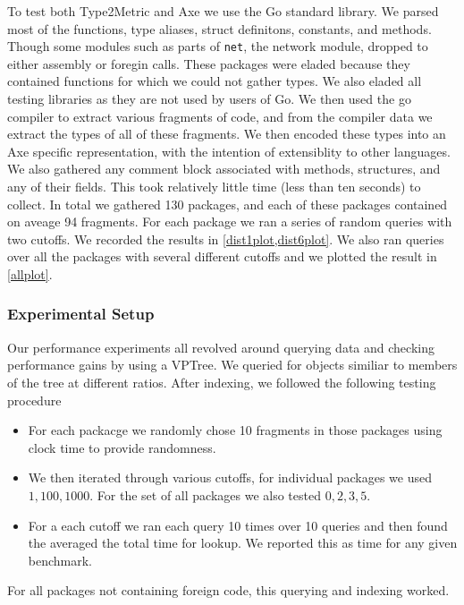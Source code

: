 To test both Type2Metric and Axe we use the Go standard library.
We parsed most of the functions, type aliases, struct definitons, constants, and methods.
Though some modules such as parts of \texttt{net}, the network module,
dropped to either assembly or foregin calls.
These packages were eladed because they contained functions for which we could not gather types.
We also eladed all testing libraries as they are not used by users of Go.
We then used the go compiler to extract various fragments of code,
and from the compiler data we extract the types of all of these fragments.
We then encoded these types into an Axe specific representation,
with the intention of extensiblity to other languages.
We also gathered any comment block associated with methods, structures, and any of their fields.
This took relatively little time (less than ten seconds) to collect.
In total we gathered 130 packages, 
and each of these packages contained on aveage 94 fragments.
For each package we ran a series of random queries with two cutoffs.
We recorded the results in \ref{dist1plot,dist6plot}.
We also ran queries over all the packages with several different cutoffs
and we plotted the result in \ref{allplot}.

\subsubsection{Experimental Setup}
Our performance 
experiments all revolved around querying data and checking performance gains
by using a VPTree.
We queried for objects similiar to members of the tree at different ratios.
After indexing, we followed the following testing procedure
\begin{itemize}
    \item 
    For each packacge we randomly chose 10 fragments in those packages 
    using clock time to provide randomness.
    \item 
    We then iterated through various cutoffs, for individual packages we 
    used $1, 100, 1000$. 
    For the set of all packages we also tested $0,2,3,5$.
    \item 
    For a each cutoff we ran each query 10 times over 10 queries 
    and then found the averaged the total time for lookup.
    We reported this as time for any given benchmark.
\end{itemize}
For all packages not containing foreign code,
this querying and indexing worked.